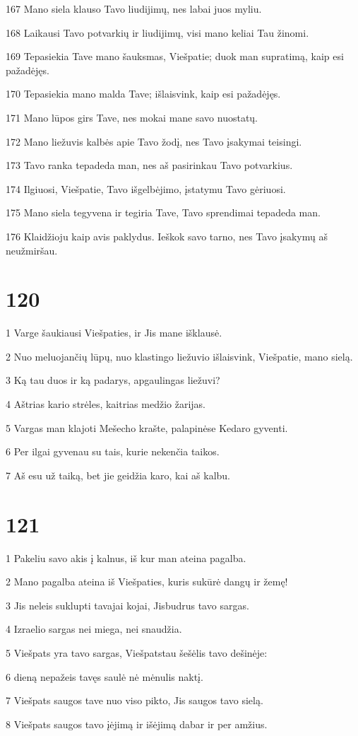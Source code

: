 \par 167 Mano siela klauso Tavo liudijimų, nes labai juos myliu. 
\par 168 Laikausi Tavo potvarkių ir liudijimų, visi mano keliai Tau žinomi. 
\par 169 Tepasiekia Tave mano šauksmas, Viešpatie; duok man supratimą, kaip esi pažadėjęs. 
\par 170 Tepasiekia mano malda Tave; išlaisvink, kaip esi pažadėjęs. 
\par 171 Mano lūpos girs Tave, nes mokai mane savo nuostatų. 
\par 172 Mano liežuvis kalbės apie Tavo žodį, nes Tavo įsakymai teisingi. 
\par 173 Tavo ranka tepadeda man, nes aš pasirinkau Tavo potvarkius. 
\par 174 Ilgiuosi, Viešpatie, Tavo išgelbėjimo, įstatymu Tavo gėriuosi. 
\par 175 Mano siela tegyvena ir tegiria Tave, Tavo sprendimai tepadeda man. 
\par 176 Klaidžioju kaip avis paklydus. Ieškok savo tarno, nes Tavo įsakymų aš neužmiršau.


\chapter{120}


\par 1 Varge šaukiausi Viešpaties, ir Jis mane išklausė. 
\par 2 Nuo meluojančių lūpų, nuo klastingo liežuvio išlaisvink, Viešpatie, mano sielą. 
\par 3 Ką tau duos ir ką padarys, apgaulingas liežuvi? 
\par 4 Aštrias kario strėles, kaitrias medžio žarijas. 
\par 5 Vargas man klajoti Mešecho krašte, palapinėse Kedaro gyventi. 
\par 6 Per ilgai gyvenau su tais, kurie nekenčia taikos. 
\par 7 Aš esu už taiką, bet jie geidžia karo, kai aš kalbu.


\chapter{121}


\par 1 Pakeliu savo akis į kalnus, iš kur man ateina pagalba. 
\par 2 Mano pagalba ateina iš Viešpaties, kuris sukūrė dangų ir žemę! 
\par 3 Jis neleis suklupti tavajai kojai, Jis­budrus tavo sargas. 
\par 4 Izraelio sargas nei miega, nei snaudžia. 
\par 5 Viešpats yra tavo sargas, Viešpats­tau šešėlis tavo dešinėje: 
\par 6 dieną nepažeis tavęs saulė nė mėnulis naktį. 
\par 7 Viešpats saugos tave nuo viso pikto, Jis saugos tavo sielą. 
\par 8 Viešpats saugos tavo įėjimą ir išėjimą dabar ir per amžius.


